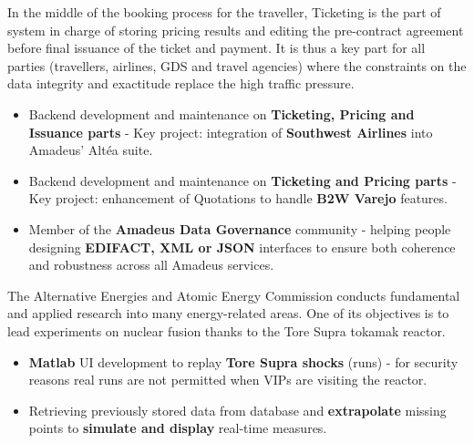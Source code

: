 \documentclass[10pt, a4paper, ragged2e]{altacv}
\begin{document}

		In the middle of the booking process for the traveller, Ticketing is the part of system in charge of storing pricing results and editing the pre-contract agreement before final issuance of the ticket and payment. It is thus a key part for all parties (travellers, airlines, GDS and travel agencies) where the constraints on the data integrity and exactitude replace the high traffic pressure.

		\medskip
		\begin{itemize}
			\item Backend development and maintenance on \textbf{Ticketing, Pricing and Issuance parts} - Key project: integration of \textbf{Southwest Airlines} into Amadeus' Altéa suite.
			\item Backend development and maintenance on \textbf{Ticketing and Pricing parts} - Key project: enhancement of Quotations to handle \textbf{B2W Varejo} features.
			\item Member of the \textbf{Amadeus Data Governance} community - helping people designing \textbf{EDIFACT, XML or JSON} interfaces to ensure both coherence and robustness across all Amadeus services.
		\end{itemize}
	\divider

		
		The Alternative Energies and Atomic Energy Commission conducts fundamental and applied research into many energy-related areas. One of its objectives is to lead experiments on nuclear fusion thanks to the Tore Supra tokamak reactor.
		
		\medskip
		\begin{itemize}
			\item \textbf{Matlab} UI development to replay \textbf{Tore Supra shocks} (runs) - for security reasons real runs are not permitted when VIPs are visiting the reactor.
			\item Retrieving previously stored data from database and \textbf{extrapolate} missing points to \textbf{simulate and display} real-time measures.
		\end{itemize}
	\divider

		
\end{document}
